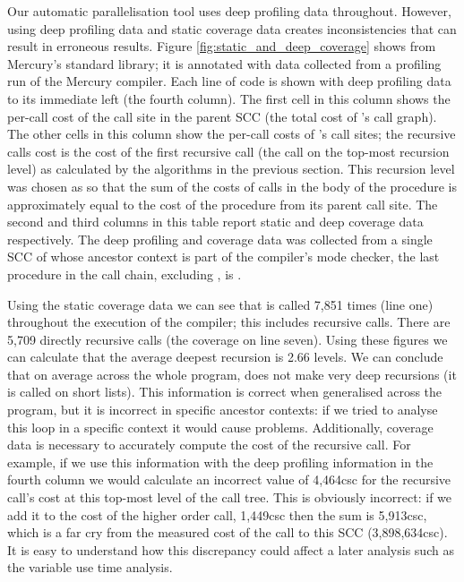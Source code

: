 Our automatic parallelisation tool uses deep profiling data throughout.
However, using deep profiling data and static coverage data creates
inconsistencies that can result in erroneous results.
Figure \ref{fig:static_and_deep_coverage} shows \listfoldlthree from
Mercury's standard library;
it is annotated with data collected from a profiling run of the Mercury
compiler.
Each line of code is shown with deep profiling data to its immediate left
(the fourth column).
The first cell in this column shows the per-call cost of the 
call site in the parent SCC (the total cost of \foldlthree's call graph).
The other cells in this column show the per-call costs of \foldlthree's call
sites;
the recursive calls cost is the cost of the first recursive call
(the call on the top-most recursion level)
as calculated by the algorithms in the previous section.
This recursion level was chosen as so that the sum of the costs of calls in
the body of the procedure is approximately equal to the cost of the procedure
from its parent call site.
The second and third columns in this table report static and deep coverage
data respectively.
The deep profiling and coverage data was collected from a single SCC of
\foldlthree whose ancestor context  is part of the compiler's mode checker,
the last procedure in the call chain, excluding \foldlthree, is
.

Using the static coverage data we can see that \foldlthree is called 7,851 times
(line one)
throughout the execution of the compiler;
this includes recursive calls.
There are 5,709 directly recursive calls (the coverage on line seven).
Using these figures we can calculate that the average deepest recursion is 
2.66 levels.
We can conclude that on average across the whole program,
\foldlthree does not make very deep recursions
(it is called on short lists).
This information is correct when generalised across the program,
but it is incorrect in specific ancestor contexts:
if we tried to analyse this loop in a specific context it would cause
problems.
Additionally, coverage data is necessary to accurately compute the cost of
the recursive call.
For example,
if we use this information with the deep profiling information in the fourth
column we would calculate an incorrect value of 4,464csc for the recursive
call's cost at this top-most level of the call tree.
This is obviously incorrect:
if we add it to the cost of the higher order call, 1,449csc
then the sum is 5,913csc,
which is a far cry from the measured cost of the call to this SCC
(3,898,634csc).
It is easy to understand how this discrepancy could affect a later analysis
such as the variable use time analysis.

